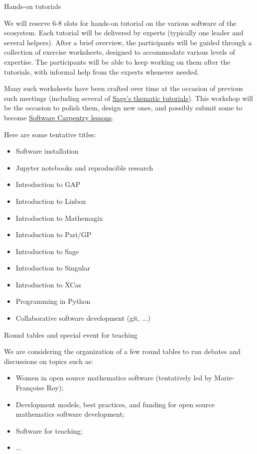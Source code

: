 \documentclass[12pt]{amsart}
\makeatletter
\def\subsection{\@startsection{subsection}{2}%
  \z@{.3\linespacing\@plus.5\linespacing}{.1\linespacing}%
  {\normalfont\bfseries}}
\makeatother
\begin{document}
\subsection{Hands-on tutorials}

We will reserve 6-8 slots for hands-on tutorial on the various
software of the ecosystem. Each tutorial will be delivered by experts
(typically one leader and several helpers). After a brief overview,
the participants will be guided through a collection of exercise
worksheets, designed to accommodate various levels of expertise.  The
participants will be able to keep working on them after the tutorials,
with informal help from the experts whenever needed.

Many such worksheets have been crafted over time at the occasion of
previous such meetings (including several of
\href{http://doc.sagemath.org/html/en/thematic_tutorials/}{Sage's
  thematic tutorials}). This workshop will be the occasion to polish them,
design new ones, and possibly submit some to become
\href{http://software-carpentry.org/lessons/}{Software Carpentry lessons}.

Here are some tentative titles:
\begin{itemize}
\item Software installation
\item Jupyter notebooks and reproducible research
\item Introduction to GAP
\item Introduction to Linbox
\item Introduction to Mathemagix
\item Introduction to Pari/GP
\item Introduction to Sage
\item Introduction to Singular
\item Introduction to XCas
\item Programming in Python
\item Collaborative software development (git, ...)
\end{itemize}

\subsection{Round tables and special event for teaching}

We are considering the organization of a few round tables to run
debates and discussions on topics such as:

\begin{itemize}
\item Women in open source mathematics software (tentatively led by
  Marie-Françoise Roy);
\item Development models, best practices, and funding for open source
  mathematics software development;
\item Software for teaching;
\item ...
\end{itemize}
\end{document}
